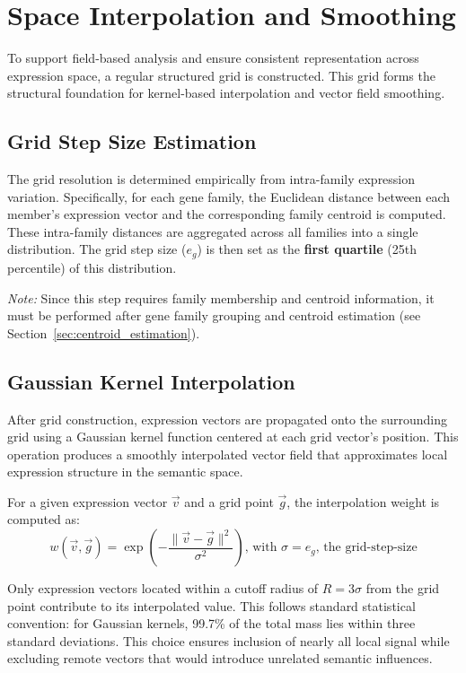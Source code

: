 \section{Space Interpolation and Smoothing}\label{sec:interpolation}

    To support field-based analysis and ensure consistent representation across expression space, a regular structured grid is constructed. This grid forms the structural foundation for kernel-based interpolation and vector field smoothing.

    \subsection{Grid Step Size Estimation}

        The grid resolution is determined empirically from intra-family expression variation. Specifically, for each gene family, the Euclidean distance between each member's expression vector and the corresponding family centroid is computed. These intra-family distances are aggregated across all families into a single distribution. The grid step size ($e_g$) is then set as the \textbf{first quartile} (25th percentile) of this distribution.

        \textit{Note:} Since this step requires family membership and centroid information, it must be performed after gene family grouping and centroid estimation (see Section~\ref{sec:centroid_estimation}).

    \subsection{Gaussian Kernel Interpolation}

        After grid construction, expression vectors are propagated onto the surrounding grid using a Gaussian kernel function centered at each grid vector's position. This operation produces a smoothly interpolated vector field that approximates local expression structure in the semantic space.

        For a given expression vector \( \vec{v} \) and a grid point \( \vec{g} \), the interpolation weight is computed as:
        \[
            w(\vec{v}, \vec{g}) = \exp\left( -\frac{\|\vec{v} - \vec{g}\|^2}{\sigma^2} \right)\text{, with } \sigma = e_g \text{, the grid-step-size}
        \]

        Only expression vectors located within a cutoff radius of \( R = 3\sigma \) from the grid point contribute to its interpolated value. This follows standard statistical convention: for Gaussian kernels, 99.7\% of the total mass lies within three standard deviations. This choice ensures inclusion of nearly all local signal while excluding remote vectors that would introduce unrelated semantic influences.

